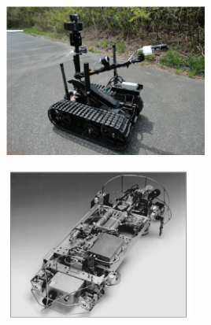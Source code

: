 \begin{figure}
	\centering
	\begin{minipage}{.5\textwidth}
		\centering
		\includegraphics[height=5cm,keepaspectratio]{Chapter2/fig/FukusimaRobot}
		\label{fig:fukuRobot}
	\end{minipage}%
	\begin{minipage}{.5\textwidth}
		\centering
		\includegraphics[width=1\linewidth,height=5cm,keepaspectratio]{Chapter2/fig/nero3}
		\label{fig:nero3}
	\end{minipage}
\end{figure}


